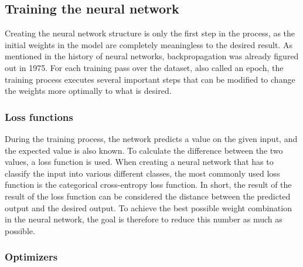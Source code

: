 
\subsection{Training the neural network}

Creating the neural network structure is only the first step in the process, as the initial weights in the model are completely meaningless to the desired result.
As mentioned in the history of neural networks, backpropagation was already figured out in 1975\cite{werbos1975beyond}.
For each training pass over the dataset, also called an epoch, the training process executes several important steps that can be modified to change the weights more optimally to what is desired.


\subsubsection{Loss functions}

During the training process, the network predicts a value on the given input, and the expected value is also known.
To calculate the difference between the two values, a loss function is used.
When creating a neural network that has to classify the input into various different classes, the most commonly used loss function is the categorical cross-entropy loss function\cite{wiki:crossentropy}.
In short, the result of the result of the loss function can be considered the distance between the predicted output and the desired output.
To achieve the best possible weight combination in the neural network, the goal is therefore to reduce this number as much as possible.

\subsubsection{Optimizers}

